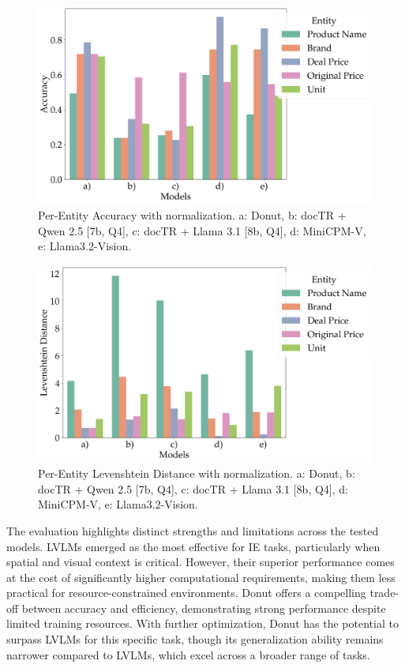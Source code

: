 \documentclass[11pt]{article}
\begin{document}
\begin{figure}[h!]
    \centering
    \includegraphics[width=0.8\linewidth]{figures/accuracies_norm.png}
    \caption{Per-Entity Accuracy with normalization. a: Donut, b: docTR + Qwen 2.5 [7b, Q4], c: docTR + Llama 3.1 [8b, Q4], d: MiniCPM-V, e: Llama3.2-Vision.}
    \label{fig:eval_final_acc_norm}
\end{figure}

\begin{figure}[h!]
    \centering
    \includegraphics[width=0.8\linewidth]{figures/levdistances_norm.png}
    \caption{Per-Entity Levenshtein Distance with normalization. a: Donut, b: docTR + Qwen 2.5 [7b, Q4], c: docTR + Llama 3.1 [8b, Q4], d: MiniCPM-V, e: Llama3.2-Vision.}
    \label{fig:eval_final_levdis_norm}
\end{figure}

 The evaluation highlights distinct strengths and limitations across the tested models. LVLMs emerged as the most effective for IE tasks, particularly when spatial and visual context is critical. However, their superior performance comes at the cost of significantly higher computational requirements, making them less practical for resource-constrained environments. Donut offers a compelling trade-off between accuracy and efficiency, demonstrating strong performance despite limited training resources. With further optimization, Donut has the potential to surpass LVLMs for this specific task, though its generalization ability remains narrower compared to LVLMs, which excel across a broader range of tasks.
\end{document}
